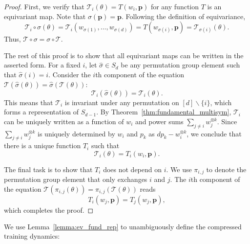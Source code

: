 \documentclass{article}
\theoremstyle{plain}
\begin{document}
\begin{proof}
    First, we verify that $\mathcal{T}_i (\theta) = T(w_i, \bm{p})$ for any function $T$ is an equivariant map. Note that $\sigma(\bm{p}) = \bm{p}$. Following the definition of equivariance, 
    \begin{equation}
        \mathcal{T}_i \circ \sigma (\theta)
        = \mathcal{T}_i (w_{\sigma(1)}, \dots, w_{\sigma(d)})
        = T(w_{\sigma(i)}, \bm{p})
        = \mathcal{T}_{\sigma(i)} (\theta)  .
    \end{equation}
    Thus, $\mathcal{T}\circ\sigma = \sigma\circ\mathcal{T}$. 

    The rest of this proof is to show that all equivariant maps can be written in the asserted form. For a fixed $i$, let $\hat{\sigma}\in S_d$ be any permutation group element such that $\hat{\sigma}(i) = i$. Consider the $i$th component of the equation $\mathcal{T}(\hat{\sigma}(\theta)) = \hat{\sigma}(\mathcal{T}(\theta))$:
    \begin{equation}
        \mathcal{T}_i(\hat{\sigma}(\theta)) = \mathcal{T}_i(\theta)   .
    \end{equation}
    This means that $\mathcal{T}_i$ is invariant under any permutation on $[d]\backslash \{i\}$, which forms a representation of $S_{d-1}$. By Theorem~\ref{thm:fundamental_multisym}, $\mathcal{T}_i$ can be uniquely written as a function of $w_i$ and power sums $\sum_{j\neq i} w_j^{\otimes k}$. Since $\sum_{j\neq i} w_j^{\otimes k}$ is uniquely determined by $w_i$ and $p_k$ as $dp_k-w_i^{\otimes k}$, we conclude that there is a unique function $T_i$ such that 
    \begin{equation}
        \mathcal{T}_i(\theta) = T_i (w_i, \bm{p}). 
    \end{equation}
    
    The final task is to show that $T_i$ does not depend on $i$. We use $\pi_{i,j}$ to denote the permutation group element that only exchanges $i$ and $j$. The $i$th component of the equation $\mathcal{T}(\pi_{i,j}(\theta)) = \pi_{i,j}(\mathcal{T}(\theta))$ reads
    \begin{equation}    \label{eq:equivariant_rep}
        T_i(w_j, \bm{p}) = T_j(w_j, \bm{p}) ,
    \end{equation}
    which completes the proof. 
\end{proof}

We use Lemma~\ref{lemma:ev_fund_rep} to unambiguously define the compressed training dynamics:
\end{document}
